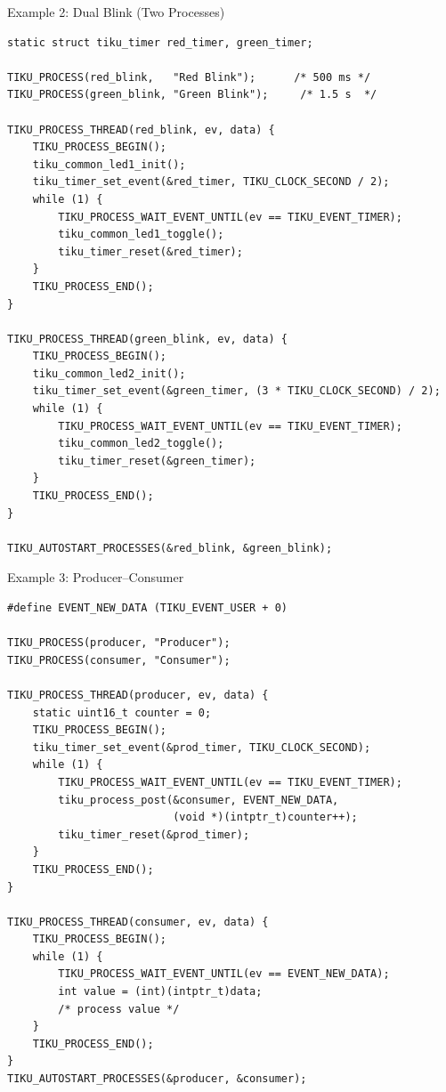 \documentclass[aspectratio=169, 10pt]{beamer}
\begin{document}
\begin{frame}[fragile]{Example 2: Dual Blink (Two Processes)}
\begin{lstlisting}[style=cstyle, title={examples/02\_dual\_blink/dual\_blink.c}]
static struct tiku_timer red_timer, green_timer;

TIKU_PROCESS(red_blink,   "Red Blink");      /* 500 ms */
TIKU_PROCESS(green_blink, "Green Blink");     /* 1.5 s  */

TIKU_PROCESS_THREAD(red_blink, ev, data) {
    TIKU_PROCESS_BEGIN();
    tiku_common_led1_init();
    tiku_timer_set_event(&red_timer, TIKU_CLOCK_SECOND / 2);
    while (1) {
        TIKU_PROCESS_WAIT_EVENT_UNTIL(ev == TIKU_EVENT_TIMER);
        tiku_common_led1_toggle();
        tiku_timer_reset(&red_timer);
    }
    TIKU_PROCESS_END();
}

TIKU_PROCESS_THREAD(green_blink, ev, data) {
    TIKU_PROCESS_BEGIN();
    tiku_common_led2_init();
    tiku_timer_set_event(&green_timer, (3 * TIKU_CLOCK_SECOND) / 2);
    while (1) {
        TIKU_PROCESS_WAIT_EVENT_UNTIL(ev == TIKU_EVENT_TIMER);
        tiku_common_led2_toggle();
        tiku_timer_reset(&green_timer);
    }
    TIKU_PROCESS_END();
}

TIKU_AUTOSTART_PROCESSES(&red_blink, &green_blink);
\end{lstlisting}
\end{frame}

\begin{frame}[fragile]{Example 3: Producer--Consumer}
\begin{lstlisting}[style=cstyle, title={examples/04\_multi\_process/multi\_process.c (simplified)}]
#define EVENT_NEW_DATA (TIKU_EVENT_USER + 0)

TIKU_PROCESS(producer, "Producer");
TIKU_PROCESS(consumer, "Consumer");

TIKU_PROCESS_THREAD(producer, ev, data) {
    static uint16_t counter = 0;
    TIKU_PROCESS_BEGIN();
    tiku_timer_set_event(&prod_timer, TIKU_CLOCK_SECOND);
    while (1) {
        TIKU_PROCESS_WAIT_EVENT_UNTIL(ev == TIKU_EVENT_TIMER);
        tiku_process_post(&consumer, EVENT_NEW_DATA,
                          (void *)(intptr_t)counter++);
        tiku_timer_reset(&prod_timer);
    }
    TIKU_PROCESS_END();
}

TIKU_PROCESS_THREAD(consumer, ev, data) {
    TIKU_PROCESS_BEGIN();
    while (1) {
        TIKU_PROCESS_WAIT_EVENT_UNTIL(ev == EVENT_NEW_DATA);
        int value = (int)(intptr_t)data;
        /* process value */
    }
    TIKU_PROCESS_END();
}
TIKU_AUTOSTART_PROCESSES(&producer, &consumer);
\end{lstlisting}
\end{frame}
\end{document}
